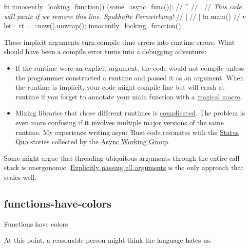 \documentclass{article}
\begin{document}
\begin{code}[rust]
fn innocently_looking_function() {
  \href{https://docs.rs/tokio/1.25.0/tokio/fn.spawn.html}{}(some_async_func());
  // ^
  // |
  // \emph{This code will panic if we remove this line. Spukhafte Fernwirkung!}
} //                                     |
  //                                     |
fn main() { //                           v
  let _rt = \href{https://docs.rs/tokio/1.25.0/tokio/runtime/struct.Runtime.html}{}::new().unwrap();
  innocently_looking_function();
}
\end{code}

These implicit arguments turn compile-time errors into runtime errors.
What should have been a compile error turns into a debugging adventure:

\begin{itemize}
  \item
    If the runtime were an explicit argument, the code would not compile unless the programmer constructed a runtime and passed it as an argument.
    When the runtime is implicit, your code might compile fine but will crash at runtime if you forget to annotate your main function with a \href{https://docs.rs/tokio/latest/tokio/attr.main.html}{magical macro}.
  \item
    Mixing libraries that chose different runtimes is \href{https://www.ncameron.org/blog/portable-and-interoperable-async-rust/}{complicated}.
    The problem is even more confusing if it involves multiple major versions of the same runtime.
    My experience writing async Rust code resonates with the \href{https://rust-lang.github.io/wg-async/vision/submitted_stories/status_quo.html}{Status Quo} stories collected by the \href{https://rust-lang.github.io/wg-async/welcome.html}{Async Working Group}.
\end{itemize}

Some might argue that threading ubiquitous arguments through the entire call stack is unergonomic.
\href{/posts/03-rust-packages-crates-modules.html#explicit-dependencies}{Explicitly passing all arguments} is the only approach that scales well.

\subsection{functions-have-colors}{Functions have colors}
\epigraph{
    At this point, a reasonable person might think the language hates us.
}{}
\end{document}
